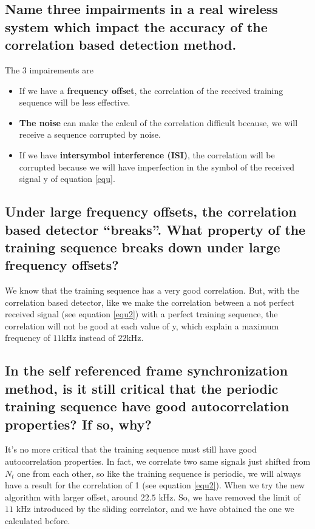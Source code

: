 \documentclass[frenchb, oneside, headings=normal]{scrartcl}
\begin{document}
\subsection{Name three impairments in a real wireless system which impact the accuracy of the correlation based detection method.}

The 3 impairements are 

\begin{itemize}

\item If we have a \textbf{frequency offset}, the correlation of the received training sequence will be less effective.

\item \textbf{The noise} can make the calcul of the correlation difficult because, we will receive a sequence corrupted by noise.

\item If we have \textbf{intersymbol interference (ISI)}, the correlation will be corrupted because we will have imperfection in the symbol of the received signal y of equation \ref{equ}.
\end{itemize}

\subsection{Under large frequency offsets, the correlation based detector “breaks”. What property of the training sequence breaks down under large frequency offsets?}

We know that the training sequence has a very good correlation. But, with the correlation based detector, like we make the correlation between a not perfect received signal (see equation \ref{equ2}) with a perfect training sequence, the correlation will not be good at each value of y, which explain a maximum frequency of $11$\si{\kilo\hertz} instead of $22$\si{\kilo\hertz}.
 
\subsection{In the self referenced frame synchronization method, is it still critical that the periodic training sequence have good autocorrelation properties? If so, why?}

It's no more critical that the training sequence must still have good autocorrelation properties. In fact, we correlate two same signals just shifted from $N_t$ one from each other, so like the training sequence is periodic, we will always have a result for the correlation of 1 (see equation \ref{equ2}). When we try the new algorithm with larger offset, around $22.5$ \si{\kilo\hertz}. So, we have removed the limit of $11$ \si{\kilo\hertz} introduced by the sliding correlator, and we have obtained the one we calculated before.
\end{document}
